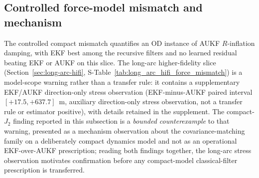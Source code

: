 \documentclass{article}
\begin{document}
\subsection{Controlled force-model mismatch and mechanism}
The controlled compact mismatch quantifies an OD instance of AUKF \(R\)-inflation damping, with EKF best among the recursive filters and no learned residual beating EKF or AUKF on this slice.
The long-arc higher-fidelity slice (Section~\ref{sec:long-arc-hifi}, S-Table~\ref{tab:long_arc_hifi_force_mismatch}) is a model-scope warning rather than a transfer rule: it contains a supplementary EKF/AUKF direction-only stress observation (EKF-minus-AUKF paired interval $[+17.5,+637.7]$~m, auxiliary direction-only stress observation, not a transfer rule or estimator positive), with details retained in the supplement. The compact-$J_2$ finding reported in this subsection is a \emph{bounded counterexample} to that warning, presented as a mechanism observation about the covariance-matching family on a deliberately compact dynamics model and not as an operational EKF-over-AUKF prescription; reading both findings together, the long-arc stress observation motivates confirmation before any compact-model classical-filter prescription is transferred.
\end{document}
